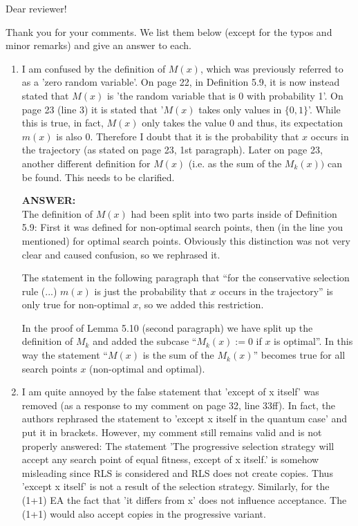 


Dear reviewer!\bigskip


Thank you for your comments. We list them below (except for the typos and minor remarks) and give an answer to each.

\begin{enumerate}

\item I am confused by the definition of $M(x)$, which was previously referred to as a 'zero random variable'. On page 22, in Definition 5.9, it is now instead stated that $M(x)$ is 'the random variable that is 0 with probability 1'. On page 23 (line 3) it is stated that '$M(x)$ takes only values in $\{0,1\}$'. While this is true, in fact, $M(x)$ only takes the value $0$ and thus, its expectation $m(x)$ is also $0$. Therefore I doubt that it is the probability that $x$ occurs in the trajectory (as stated on page 23, 1st paragraph). Later on page 23, another different definition for $M(x)$ (i.e. as the sum of the $M_k(x))$ can be found. This needs to be clarified.

{\bf ANSWER:}\\
The definition of $M(x)$ had been split into two parts inside of Definition 5.9: First it was defined for non-optimal search points, then (in the line you mentioned) for optimal search points. Obviously this distinction was not very clear and caused confusion, so we rephrased it.
 
The statement in the following paragraph that ``for the conservative selection rule (...) $m(x)$ is just the probability that $x$ occurs in the trajectory'' is only true for non-optimal $x$, so we added this restriction.

In the proof of Lemma 5.10 (second paragraph) we have split up the definition of $M_k$ and added the subcase ``$M_k(x) := 0$ if $x$ is optimal''. In this way the statement ``$M(x)$ is the sum of the $M_k(x)$'' becomes true for all search points $x$ (non-optimal and optimal).

\item I am quite annoyed by the false statement that 'except of x itself' was removed (as a response to my comment on page 32, line 33ff). In fact, the authors rephrased the statement to 'except x itself in the quantum case' and put it in brackets. However, my comment still remains valid and is not properly answered: The statement 'The progressive selection strategy will accept any search point of equal fitness, except of x itself.' is somehow misleading since RLS is considered and RLS does not create copies. Thus 'except x itself' is not a result of the selection strategy. Similarly, for the (1+1) EA the fact that 'it differs from x' does not influence acceptance. The (1+1) would also accept copies in the progressive variant.


\end{enumerate}
